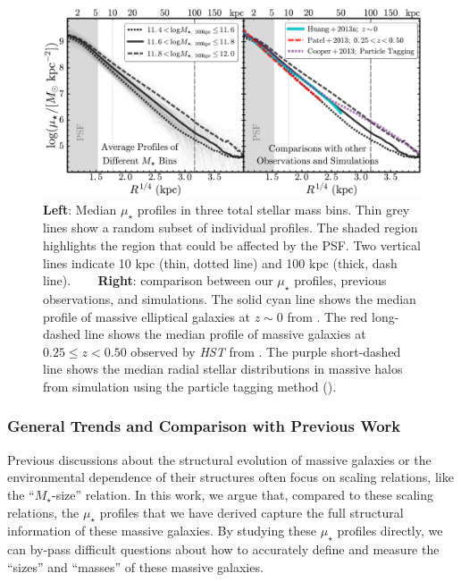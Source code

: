\documentclass[a4paper,fleqn,usenatbib]{mnras}
\def\mstar{{$M_{\star}$}}
\def\mden{{$\mu_{\star}$}}
\begin{document}
  \begin{figure}
      \centering 
      \includegraphics[width=\textwidth]{fig/average_mass_profiles_fsps1_A}
      \caption{
          \textbf{Left}: Median \mden{} profiles in three total stellar mass bins. 
              Thin grey lines show a random subset of individual profiles. 
              The shaded region highlights the region that could be affected by the PSF. 
              Two vertical lines indicate 10 kpc (thin, dotted line) and
              100 kpc (thick, dash line). ~~~ 
          \textbf{Right}: comparison between our \mden{} profiles, previous observations, 
              and simulations. 
              The solid cyan line shows the median profile of massive elliptical 
              galaxies at $z{\sim} 0$ from \citet[][]{Huang2013a}. 
              The red long-dashed line shows the median profile of massive galaxies at 
              $0.25 \leq z < 0.50$ observed by \textit{HST} from \citet[][]{Patel2013}. 
              The purple short-dashed line shows the median radial stellar distributions 
              in massive halos from simulation using the particle tagging method
              (\citealt{Cooper2013}).}
      \label{fig:avg_prof}
  \end{figure}


\subsubsection{General Trends and Comparison with Previous Work}
    \label{sssec:sbp_inter}
          
    Previous discussions about the structural evolution of massive galaxies or the 
    environmental dependence of their structures often focus on scaling relations,  
    like the ``\mstar{}-size'' relation. 
    In this work, we argue that, compared to these scaling relations, the \mden{} 
    profiles that we have derived capture the full structural information of these 
    massive galaxies.
    By studying these \mden{} profiles directly, we can by-pass difficult questions 
    about how to accurately define and measure the ``sizes'' and ``masses'' of these 
    massive galaxies. 
    
\end{document}
